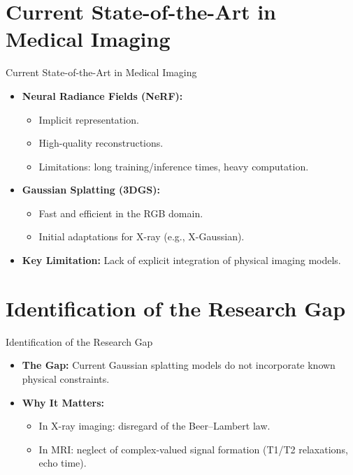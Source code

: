 \documentclass{beamer}
\begin{document}
\section{Current State-of-the-Art in Medical Imaging}
\begin{frame}{Current State-of-the-Art in Medical Imaging}
    \begin{itemize}
        \item \textbf{Neural Radiance Fields (NeRF):}
        \begin{itemize}
            \item Implicit representation.
            \item High-quality reconstructions.
            \item Limitations: long training/inference times, heavy computation.
        \end{itemize}
        \item \textbf{Gaussian Splatting (3DGS):}
        \begin{itemize}
            \item Fast and efficient in the RGB domain.
            \item Initial adaptations for X-ray (e.g., X-Gaussian).
        \end{itemize}
        \item \textbf{Key Limitation:} Lack of explicit integration of physical imaging models.
    \end{itemize}
\end{frame}

\section{Identification of the Research Gap}
\begin{frame}{Identification of the Research Gap}
    \begin{itemize}
        \item \textbf{The Gap:} Current Gaussian splatting models do not incorporate known physical constraints.
        \item \textbf{Why It Matters:}
        \begin{itemize}
            \item In X-ray imaging: disregard of the Beer–Lambert law.
            \item In MRI: neglect of complex-valued signal formation (T1/T2 relaxations, echo time).
        \end{itemize}
    \end{itemize}
\end{frame}
\end{document}
